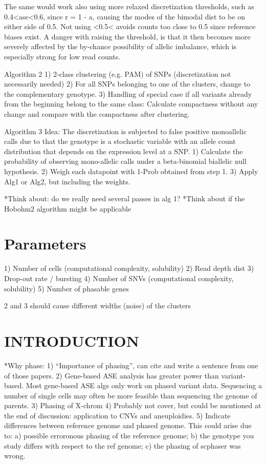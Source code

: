 The same would work also using more relaxed discretization thresholds, such as 0.4<ase<0.6, since r = 1 - a, causing the modes of the bimodal dist to be on either side of 0.5.
Not using <0.5< avoids counts too close to 0.5 since reference biases exist. A danger with raising the threshold, is that it then becomes more severely affected by the by-chance possibility of allelic imbalance, which is especially strong for low read counts.

Algorithm 2
1) 2-class clustering (e.g. PAM) of SNPs (discretization not necessarily needed)
2) For all SNPs belonging to one of the clusters, change to the complementary genotype.
3) Handling of special case if all variants already from the beginning belong to
the same class: Calculate compactness without any
change and compare with the compactness after clustering.

Algorithm 3
Idea: The discretization is subjected to false positive monoallelic calls due to that the genotype is a stochastic variable with an allele count distribution that depends on the expression level at a SNP.
1) Calculate the probability of observing mono-allelic calls under a beta-binomial biallelic null hypothesis.
2) Weigh each datapoint with 1-Prob obtained from step 1. 
3) Apply Alg1 or Alg2, but including the weights.

*Think about: do we really need several passes in alg 1?
*Think about if the Hobohm2 algorithm might be applicable


\section{Parameters}
1) Number of cells (computational complexity, solubility)
2) Read depth dist
3) Drop-out rate / bursting
4) Number of SNVs (computational complexity, solubility)
5) Number of phasable genes

2 and 3 should cause different widths (noise) of the clusters


\section{INTRODUCTION}
*Why phase:
1) ``Importance of phasing'', can cite and write a sentence from one of those papers.
2) Gene-based ASE analysis has greater power than variant-based. Most gene-based ASE algs only work on phased variant data. Sequencing a number of single cells may often be more feasible than sequencing the genome of parents.
3) Phasing of X-chrom
4) Probably not cover, but could be mentioned at the end of
discussion: application to CNVs and aneuploidies.
5) Indicate differences between reference genome and phased
genome. This could arise due to: a) possible erroronous phasing of
the reference genome; b) the genotype you study differs with respect to
the ref genome; c) the phasing of scphaser was wrong.

